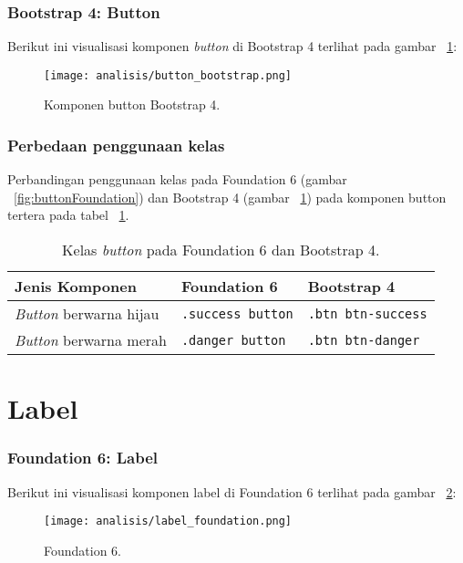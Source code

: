 \subsubsection{Bootstrap 4: Button}
Berikut ini visualisasi komponen \textit{button} di Bootstrap 4 terlihat pada gambar ~\ref{fig:buttonBootstrap}:
\begin{figure} [H]	
	\centering
	\texttt{[image: analisis/button\_bootstrap.png]}
	\caption{Komponen button Bootstrap 4.}
	\label{fig:buttonBootstrap}
\end{figure}

\subsubsection{Perbedaan penggunaan kelas}
\noindent Perbandingan penggunaan kelas pada Foundation 6 (gambar ~\ref{fig:buttonFoundation}) dan Bootstrap 4 (gambar ~\ref{fig:buttonBootstrap}) pada komponen button tertera pada tabel ~\ref{table:button}.\\

\begin{table}[H] 
	\caption{Kelas \textit{button} pada Foundation 6 dan Bootstrap 4.}
	\begin{tabular}{| p{} | p{} | p{} |} 
		\hline
		\textbf{Jenis Komponen} & \textbf{Foundation 6} & \textbf{Bootstrap 4}  \\ [0.5ex] 
		\hline	
		\textit{Button} berwarna hijau & \texttt{.success button} & \texttt{.btn btn-success}\\ 
		\hline
		\textit{Button} berwarna merah & \texttt{.danger button} & \texttt{.btn btn-danger}\\ [1ex]
		\hline
	\end{tabular}
	\label{table:button}
\end{table}

\section{Label}	
\subsubsection{Foundation 6: Label}
Berikut ini visualisasi komponen label di Foundation 6 terlihat pada gambar ~\ref{fig:labelFoundation}:
	\begin{figure}[H]
		\centering  
		\texttt{[image: analisis/label\_foundation.png]}
		\caption{Foundation 6.} 
		\label{fig:labelFoundation}
	\end{figure}
